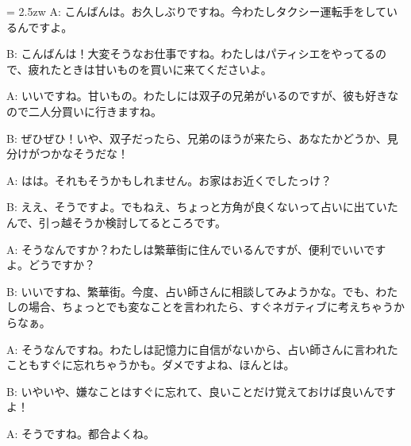 \documentclass[11pt]{amsart}
\title{}
\author{}
\newenvironment{hangall}[1]{\hangindent = 2.5zw\everypar{\hangindent = 2.5zw}}{}
\begin{document}
\maketitle
\begin{hangall}{}%
A: こんばんは。お久しぶりですね。今わたしタクシー運転手をしているんですよ。

B: こんばんは！大変そうなお仕事ですね。わたしはパティシエをやってるので、疲れたときは甘いものを買いに来てくださいよ。

A: いいですね。甘いもの。わたしには双子の兄弟がいるのですが、彼も好きなので二人分買いに行きますね。

B: ぜひぜひ！いや、双子だったら、兄弟のほうが来たら、あなたかどうか、見分けがつかなそうだな！

A: はは。それもそうかもしれません。お家はお近くでしたっけ？

B: ええ、そうですよ。でもねえ、ちょっと方角が良くないって占いに出ていたんで、引っ越そうか検討してるところです。

A: そうなんですか？わたしは繁華街に住んでいるんですが、便利でいいですよ。どうですか？

B: いいですね、繁華街。今度、占い師さんに相談してみようかな。でも、わたしの場合、ちょっとでも変なことを言われたら、すぐネガティブに考えちゃうからなぁ。

A: そうなんですね。わたしは記憶力に自信がないから、占い師さんに言われたこともすぐに忘れちゃうかも。ダメですよね、ほんとは。

B: いやいや、嫌なことはすぐに忘れて、良いことだけ覚えておけば良いんですよ！

A: そうですね。都合よくね。
\end{hangall}
\end{document}

